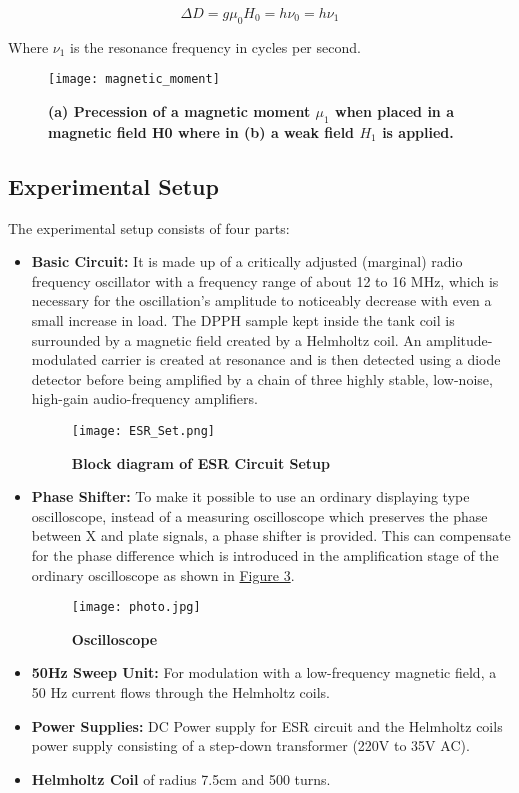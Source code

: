 		$$\Delta D = g\mu_0 H_0 = h\nu_0 = h\nu_1$$

		Where $\nu_1$ is the resonance frequency in cycles per second.

		\begin{figure}[H]
			\centering
			\texttt{[image: magnetic\_moment]}
			\caption{\textbf{(a) Precession of a magnetic moment $\mu_1$ when placed in a magnetic field H0 where in (b) a weak field $H_1$ is applied.}}
			\label{fig:1}
		\end{figure}

	\subsection{Experimental Setup}
	
		The experimental setup consists of four parts:
		\begin{itemize}
			\item \textbf{Basic Circuit:} It is made up of a critically adjusted (marginal) radio frequency oscillator with a frequency range of about 12 to 16 MHz, which is necessary for the oscillation's amplitude to noticeably decrease with even a small increase in load. The DPPH sample kept inside the tank coil is surrounded by a magnetic field created by a Helmholtz coil. An amplitude-modulated carrier is created at resonance and is then detected using a diode detector before being amplified by a chain of three highly stable, low-noise, high-gain audio-frequency amplifiers.
				\begin{figure}[H]
					\centering
					\texttt{[image: ESR\_Set.png]}
					\caption{\textbf{Block diagram of ESR Circuit Setup}}
					\label{fig:2}
				\end{figure}
			\item \textbf{Phase Shifter:} To make it possible to use an ordinary displaying type oscilloscope, instead of a measuring oscilloscope which preserves the phase between X and plate signals, a phase shifter is provided. This can compensate for the phase difference which is introduced in the amplification stage of the ordinary oscilloscope as shown in \hyperref[fig:3]{Figure 3}.
				\begin{figure}[H]
					\centering
					\texttt{[image: photo.jpg]}
					\caption{\textbf{Oscilloscope}}
					\label{fig:3}
				\end{figure}
			\item \textbf{50Hz Sweep Unit:} For modulation with a low-frequency magnetic field, a 50 Hz current flows through the Helmholtz coils.
			\item \textbf{Power Supplies:} DC Power supply for ESR circuit and the Helmholtz coils power supply consisting of a step-down transformer (220V to 35V AC).
			\item \textbf{Helmholtz Coil} of radius 7.5cm and 500 turns.
		\end{itemize}

